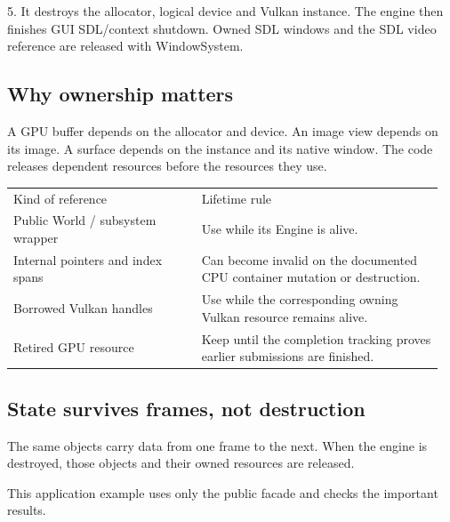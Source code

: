 \documentclass[11pt,a4paper]{article}
\begin{document}
5. It destroys the allocator, logical device and Vulkan instance. The engine then finishes GUI SDL/context shutdown. Owned SDL windows and the SDL video reference are released with WindowSystem.

\subsection*{Why ownership matters}
A GPU buffer depends on the allocator and device. An image view depends on its image. A surface depends on the instance and its native window. The code releases dependent resources before the resources they use.

{\small
\begin{longtable}{@{}p{0.42\linewidth}p{0.54\linewidth}@{}}
Kind of reference & Lifetime rule \\
Public World / subsystem wrapper & Use while its Engine is alive. \\
Internal pointers and index spans & Can become invalid on the documented CPU container mutation or destruction. \\
Borrowed Vulkan handles & Use while the corresponding owning Vulkan resource remains alive. \\
Retired GPU resource & Keep until the completion tracking proves earlier submissions are finished. \\
\end{longtable}
}

\subsection*{State survives frames, not destruction}
The same objects carry data from one frame to the next. When the engine is destroyed, those objects and their owned resources are released.

\label{core-46}
This application example uses only the public facade and checks the important results.
\end{document}
